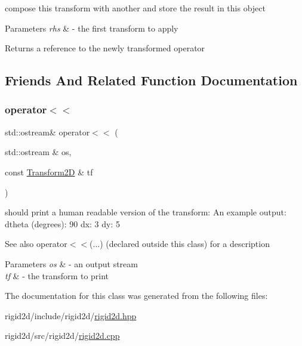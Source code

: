 compose this transform with another and store the result in this object 


\begin{DoxyParams}{Parameters}
{\em rhs} & -\/ the first transform to apply \\
\hline
\end{DoxyParams}
\begin{DoxyReturn}{Returns}
a reference to the newly transformed operator 
\end{DoxyReturn}


\subsection{Friends And Related Function Documentation}
\mbox{\label{classrigid2d_1_1Transform2D_ad5239a3fa3a0f9cebd73c39f34c2075f}} 
\subsubsection{\texorpdfstring{operator$<$$<$}{operator<<}}
{\footnotesize\ttfamily std\+::ostream\& operator$<$$<$ (\begin{DoxyParamCaption}\item[{std\+::ostream \&}]{os,  }\item[{const \hyperlink{classrigid2d_1_1Transform2D}{Transform2D} \&}]{tf }\end{DoxyParamCaption})\hspace{0.3cm}{\ttfamily [friend]}}



should print a human readable version of the transform\+: An example output\+: dtheta (degrees)\+: 90 dx\+: 3 dy\+: 5 

\begin{DoxySeeAlso}{See also}
operator$<$$<$(...) (declared outside this class) for a description
\end{DoxySeeAlso}

\begin{DoxyParams}{Parameters}
{\em os} & -\/ an output stream \\
\hline
{\em tf} & -\/ the transform to print \\
\hline
\end{DoxyParams}


The documentation for this class was generated from the following files\+:\begin{DoxyCompactItemize}
\item 
rigid2d/include/rigid2d/\hyperlink{rigid2d_8hpp}{rigid2d.\+hpp}\item 
rigid2d/src/rigid2d/\hyperlink{rigid2d_8cpp}{rigid2d.\+cpp}\end{DoxyCompactItemize}
